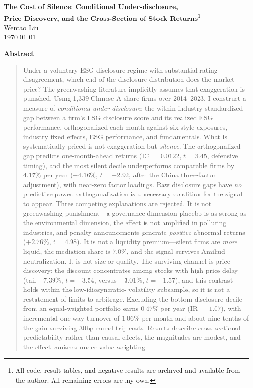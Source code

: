 \documentclass[12pt]{article}
\begin{document}
\begin{titlepage}
\begin{center}
{\Large\bfseries The Cost of Silence: Conditional Under-disclosure,\\[2pt]
Price Discovery, and the Cross-Section of Stock
Returns\footnote{All code, result tables, and negative results are archived
and available from the author. All remaining errors are my own.}}\\[20pt]

{\large Wentao Liu}\\[2pt]
{\today}
\end{center}

\vspace{10pt}
\begin{center}{\bfseries Abstract}\end{center}
\begin{quote}
\singlespacing\small
\noindent
Under a voluntary ESG disclosure regime with substantial rating disagreement,
which end of the disclosure distribution does the market price? The
greenwashing literature implicitly assumes that exaggeration is punished. Using
1{,}339 Chinese A-share firms over 2014--2023, I construct a measure of
\emph{conditional under-disclosure}: the within-industry standardized gap
between a firm's ESG disclosure score and its realized ESG performance,
orthogonalized each month against six style exposures, industry fixed effects,
ESG performance, and fundamentals. What is systematically priced is not
exaggeration but \emph{silence}. The orthogonalized gap predicts one-month-ahead
returns (IC $=0.0122$, $t=3.45$, defensive timing), and the most silent decile
underperforms comparable firms by $4.17\%$ per year ($-4.16\%$, $t=-2.92$,
after the \citet{liu2019} China three-factor adjustment), with near-zero factor
loadings. Raw disclosure gaps have \emph{no} predictive power: orthogonalization
is a necessary condition for the signal to appear. Three competing explanations
are rejected. It is not greenwashing punishment---a governance-dimension
placebo is as strong as the environmental dimension, the effect is not
amplified in polluting industries, and penalty announcements generate
\emph{positive} abnormal returns ($+2.76\%$, $t=4.98$). It is not a liquidity
premium---silent firms are \emph{more} liquid, the mediation share is $7.0\%$,
and the signal survives Amihud neutralization. It is not size or quality. The
surviving channel is price discovery: the discount concentrates among stocks
with high \citet{hou2005} price delay (tail $-7.39\%$, $t=-3.54$, versus
$-3.01\%$, $t=-1.57$), and this contrast holds within the low-idiosyncratic-
volatility subsample, so it is not a restatement of limits to arbitrage.
Excluding the bottom disclosure decile from an equal-weighted portfolio earns
$0.47\%$ per year (IR $=1.07$), with incremental one-way turnover of $1.06\%$
per month and about nine-tenths of the gain surviving 30bp round-trip costs.
Results describe cross-sectional predictability rather than causal effects, the
magnitudes are modest, and the effect vanishes under value weighting.
\end{quote}


\end{titlepage}
\end{document}
